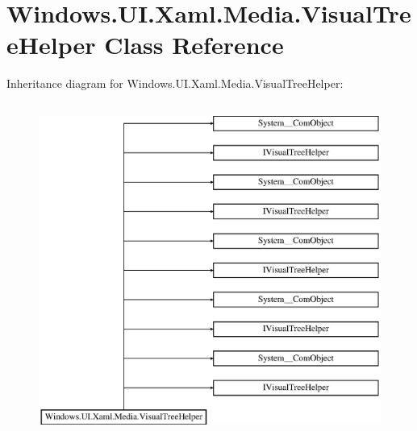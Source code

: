 \hypertarget{class_windows_1_1_u_i_1_1_xaml_1_1_media_1_1_visual_tree_helper}{}\section{Windows.\+U\+I.\+Xaml.\+Media.\+Visual\+Tree\+Helper Class Reference}
\label{class_windows_1_1_u_i_1_1_xaml_1_1_media_1_1_visual_tree_helper}
Inheritance diagram for Windows.\+U\+I.\+Xaml.\+Media.\+Visual\+Tree\+Helper\+:\begin{figure}[H]
\begin{center}
\leavevmode
\includegraphics[height=11.000000cm]{class_windows_1_1_u_i_1_1_xaml_1_1_media_1_1_visual_tree_helper}
\end{center}
\end{figure}
